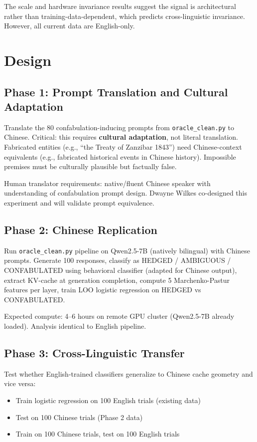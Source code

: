 \documentclass[11pt,letterpaper]{article}
\begin{document}
\noindent The scale and hardware invariance results suggest the signal is architectural rather than training-data-dependent, which predicts cross-linguistic invariance. However, all current data are English-only.

\section{Design}

\subsection{Phase 1: Prompt Translation and Cultural Adaptation}

Translate the 80 confabulation-inducing prompts from \texttt{oracle\_clean.py} to Chinese. Critical: this requires \textbf{cultural adaptation}, not literal translation. Fabricated entities (e.g., ``the Treaty of Zanzibar 1843'') need Chinese-context equivalents (e.g., fabricated historical events in Chinese history). Impossible premises must be culturally plausible but factually false.

Human translator requirements: native/fluent Chinese speaker with understanding of confabulation prompt design. Dwayne Wilkes co-designed this experiment and will validate prompt equivalence.

\subsection{Phase 2: Chinese Replication}

Run \texttt{oracle\_clean.py} pipeline on Qwen2.5-7B (natively bilingual) with Chinese prompts. Generate 100 responses, classify as HEDGED / AMBIGUOUS / CONFABULATED using behavioral classifier (adapted for Chinese output), extract KV-cache at generation completion, compute 5 Marchenko-Pastur features per layer, train LOO logistic regression on HEDGED vs CONFABULATED.

Expected compute: 4--6 hours on remote GPU cluster (Qwen2.5-7B already loaded). Analysis identical to English pipeline.

\subsection{Phase 3: Cross-Linguistic Transfer}

Test whether English-trained classifiers generalize to Chinese cache geometry and vice versa:
\begin{itemize}
  \item Train logistic regression on 100 English trials (existing data)
  \item Test on 100 Chinese trials (Phase 2 data)
  \item Train on 100 Chinese trials, test on 100 English trials
\end{itemize}
\end{document}

